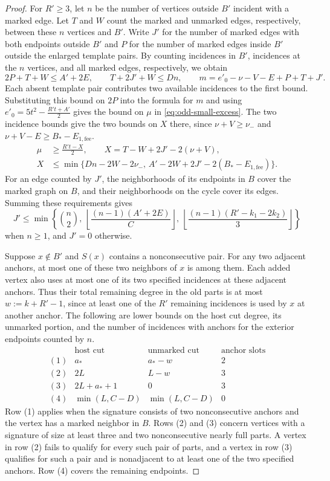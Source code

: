 \begin{proof}
For $R'\geq3$, let $n$ be the number of vertices outside $B'$ incident
with a marked edge. Let $T$ and $W$ count the marked and unmarked
edges, respectively, between these $n$ vertices and $B'$. Write $J'$
for the number of marked edges with both endpoints outside $B'$ and
$P$ for the number of marked edges inside $B'$ outside the enlarged
template pairs. By counting incidences in $B'$, incidences at the $n$
vertices, and all marked edges, respectively, we obtain
\[
 2P+T+W\leq A'+2E,\qquad T+2J'+W\leq Dn,\qquad
 m=e'_0-\nu-V-E+P+T+J'.
\]
Each absent template pair contributes two available incidences to
the first bound. Substituting this bound on $2P$ into the formula
for $m$ and using $e'_0=5t^2-\frac{R't+A'}{2}$ gives the bound on
$\mu$ in \eqref{eq:odd-small-excess}. The two incidence bounds give
the two bounds on $X$ there, since $\nu+V\geq \nu_-$ and
$\nu+V-E\geq B_*-E_{1,\mathrm{fee}}$.
\begin{equation}\label{eq:odd-small-excess}
 \begin{split}
 \mu&\geq \frac{R't-X}{2},\qquad X=T-W+2J'-2(\nu+V),\\
 X&\leq \min\{Dn-2W-2\nu_-,\,
          A'-2W+2J'-2(B_*-E_{1,\mathrm{fee}})\}.
 \end{split}
\end{equation}
For an edge counted by $J'$, the neighborhoods of its endpoints
in $B$ cover the marked graph on $B$, and their neighborhoods on
the cycle cover its edges. Summing these requirements gives
\[
 J'\leq \min\left\{\binom{n}{2},\ 
      \left\lfloor\frac{(n-1)(A'+2E)}{C}\right\rfloor,\ 
      \left\lfloor\frac{(n-1)(R'-k_1-2k_2)}{3}\right\rfloor\right\}
\]
when $n\geq1$, and $J'=0$ otherwise.

Suppose $x\notin B'$ and $S(x)$ contains a nonconsecutive pair.
For any two adjacent anchors, at most one of these two neighbors
of $x$ is among them. Each added vertex also uses at most one
of its two specified incidences at these adjacent anchors.
Thus their total remaining degree in the old parts is at most
$w:=k+R'-1$, since at least one of the $R'$ remaining incidences
is used by $x$ at another anchor. The following are lower bounds on
the host cut degree, its unmarked portion, and the number of
incidences with anchors for the exterior endpoints counted by $n$.
\[
\begin{array}{c|ccc}
 &\text{host cut}&\text{unmarked cut}&\text{anchor slots}\\ \hline
 (1)&a_*&a_*-w&2\\
 (2)&2L&L-w&3\\
 (3)&2L+a_*+1&0&3\\
 (4)&\min(L,C-D)&\min(L,C-D)&0
\end{array}
\]
Row (1) applies when the signature consists of two nonconsecutive
anchors and the vertex has a marked neighbor in $B$. Rows (2) and
(3) concern vertices with a signature of size at least three and
two nonconsecutive nearly full parts. A vertex in row (2) fails
to qualify for every such pair of parts, and a vertex in row (3)
qualifies for such a pair and is nonadjacent to at least one of
the two specified anchors. Row (4) covers the remaining endpoints.


\end{proof}
